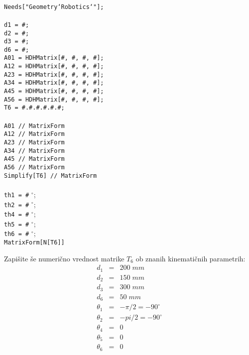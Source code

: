 \small %
\texttt{} \\
\texttt{Needs["Geometry`Robotics`"];} \\
\texttt{} \\
\texttt{d1 = \#;} \\
\texttt{d2 = \#;} \\
\texttt{d3 = \#;} \\
\texttt{d6 = \#;} \\
\texttt{A01 = HDHMatrix[\#, \#, \#, \#];} \\
\texttt{A12 = HDHMatrix[\#, \#, \#, \#];} \\
\texttt{A23 = HDHMatrix[\#, \#, \#, \#];} \\
\texttt{A34 = HDHMatrix[\#, \#, \#, \#];} \\
\texttt{A45 = HDHMatrix[\#, \#, \#, \#];} \\
\texttt{A56 = HDHMatrix[\#, \#, \#, \#];} \\
\texttt{T6 = \#.\#.\#.\#.\#.\#;} \\
\texttt{} \\
\texttt{A01 // MatrixForm} \\
\texttt{A12 // MatrixForm} \\
\texttt{A23 // MatrixForm} \\
\texttt{A34 // MatrixForm} \\
\texttt{A45 // MatrixForm} \\
\texttt{A56 // MatrixForm} \\
\texttt{Simplify[T6] // MatrixForm} \\
\texttt{} \\
\texttt{th1 = \#} $^{\circ}$; \\
\texttt{th2 = \#} $^{\circ}$; \\
\texttt{th4 = \#} $^{\circ}$; \\
\texttt{th5 = \#} $^{\circ}$; \\
\texttt{th6 = \#} $^{\circ}$; \\
\texttt{MatrixForm[N[T6]]} \\
\normalsize %


Zapišite še numerično vrednost matrike $T_6$ ob znanih kinematičnih
parametrih:
\begin{eqnarray}
d_1 &=& 200 \; mm \nonumber \\
d_2 &=& 150 \; mm \nonumber \\
d_3 &=& 300 \; mm \nonumber \\
d_6 &=& 50 \; mm \nonumber \\
\theta_1 &=& -\pi/2 = -90 ^\circ \nonumber \\
\theta_2 &=& -pi/2 = -90 ^\circ \nonumber \\
\theta_4 &=& 0 \nonumber \\
\theta_5 &=& 0 \nonumber \\
\theta_6 &=& 0 \nonumber
\end{eqnarray}

